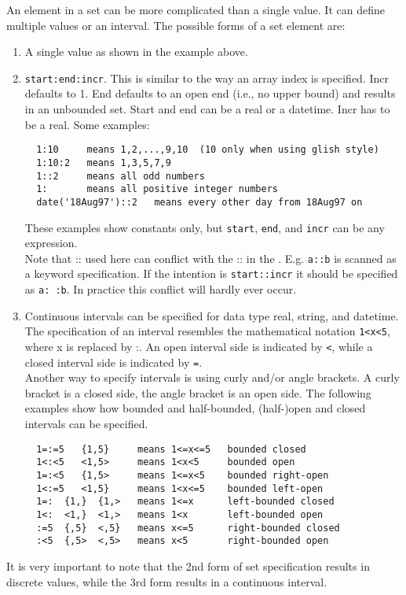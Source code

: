 An element in a set can be more complicated than a single value.
It can define multiple values or an interval. The possible forms of
a set element are:
\begin{enumerate}
\item A single value as shown in the example above.
\item \texttt{start:end:incr}. This is similar to the
way an array index is specified. Incr defaults to 1.
End defaults to an open end (i.e., no upper bound) and results
in an unbounded set. Start and end can be a real or a datetime.
Incr has to be a real. Some examples:
\begin{verbatim}
  1:10     means 1,2,...,9,10  (10 only when using glish style)
  1:10:2   means 1,3,5,7,9
  1::2     means all odd numbers
  1:       means all positive integer numbers
  date('18Aug97')::2   means every other day from 18Aug97 on
\end{verbatim}
These examples show constants only, but \texttt{start}, \texttt{end},
and \texttt{incr} can be any expression.
\\Note that :: used here can conflict with the :: in the
. E.g. \texttt{a::b} is scanned as
a keyword specification. If the intention is \texttt{start::incr}
it should be specified as \texttt{a: :b}. In practice this conflict
will hardly ever occur.
\item Continuous intervals can be specified for data type real, string, and datetime.
The specification of an interval resembles the mathematical notation
\texttt{1<x<5}, where x is replaced by :. An open interval side
is indicated by \texttt{<}, while a closed interval side is indicated
by \texttt{=}.
\\Another way to specify intervals is using curly and/or angle brackets.
A curly bracket is a closed side, the angle bracket is an open side.
The following examples show how bounded and half-bounded,
(half-)open and closed intervals can be specified.
\begin{verbatim}
  1=:=5   {1,5}     means 1<=x<=5   bounded closed
  1<:<5   <1,5>     means 1<x<5     bounded open
  1=:<5   {1,5>     means 1<=x<5    bounded right-open
  1<:=5   <1,5}     means 1<x<=5    bounded left-open
  1=:  {1,}  {1,>   means 1<=x      left-bounded closed
  1<:  <1,}  <1,>   means 1<x       left-bounded open
  :=5  {,5}  <,5}   means x<=5      right-bounded closed
  :<5  {,5>  <,5>   means x<5       right-bounded open
\end{verbatim}
\end{enumerate}
It is very important to note that the 2nd form of set specification results in
discrete values, while the 3rd form results in a continuous interval.

